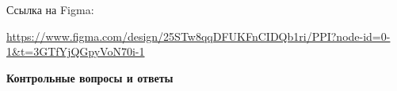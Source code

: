 \noindent
\begin{minipage}{\linewidth}
\end{minipage}
\bigskip

Ссылка на Figma:

\url{https://www.figma.com/design/25STw8qqDFUKFnCIDQb1ri/PPI?node-id=0-1&t=3GTfYjQGpyVoN70i-1}
\bigskip

\textbf{Контрольные вопросы и ответы}

